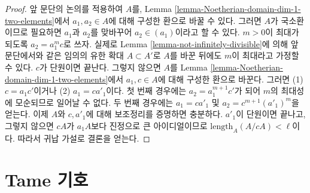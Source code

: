 \begin{proof}
\medskip\noindent
앞 문단의 논의를 적용하여 $A$를, Lemma
\ref{lemma-Noetherian-domain-dim-1-two-elements}에서
$a_1, a_2 \in A$에 대해 구성한 환으로 바꿀 수 있다. 그러면 $A$가
국소환이므로 필요하면 $a_1$과 $a_2$를 맞바꾸어 $a_2 \in (a_1)$이라고
할 수 있다. $m > 0$이 최대가 되도록 $a_2 = a_1^m c$로 쓰자. 실제로
Lemma \ref{lemma-not-infinitely-divisible}에 의해 앞 문단에서와 같은
임의의 유한 확대 $A \subset A'$로 $A$를 바꾼 뒤에도 $m$이 최대라고
가정할 수 있다. $c$가 단원이면 끝난다. 그렇지 않으면 $A$를 Lemma
\ref{lemma-Noetherian-domain-dim-1-two-elements}에서
$a_1, c \in A$에 대해 구성한 환으로 바꾼다. 그러면 (1)
$c = a_1 c'$이거나 (2) $a_1 = c a'_1$이다. 첫 번째 경우에는
$a_2 = a_1^{m + 1} c'$가 되어 $m$의 최대성에 모순되므로 일어날 수
없다. 두 번째 경우에는 $a_1 = c a'_1$ 및
$a_2 = c^{m + 1} (a'_1)^m$을 얻는다. 이제 $A$와 $c, a'_1$에 대해
보조정리를 증명하면 충분하다. $a'_1$이 단원이면 끝나고, 그렇지 않으면
$cA$가 $a_1A$보다 진정으로 큰 아이디얼이므로
$\text{length}_A(A/cA) < \ell$이다. 따라서 귀납 가설로 결론을 얻는다.
\end{proof}





\section{Tame 기호}
\label{section-tame-symbol}

